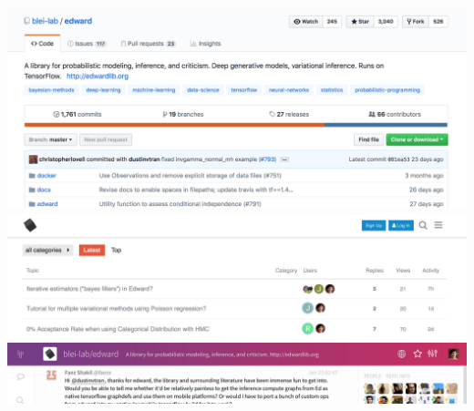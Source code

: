 \documentclass[10pt,
               xcolor={usenames,dvipsnames},
               hyperref={colorlinks,linktoc=all,citecolor=Plum,linkcolor=MidnightBlue,urlcolor=MidnightBlue},noamssymb]{beamer}
\begin{document}
\begin{frame}
\begin{center}
\vspace{-2.5ex}
\includegraphics[width=1.0\textwidth]{img/github.png}
\\[-1.5ex]
\includegraphics[width=1.0\textwidth]{img/forum.png}
\\[-3ex]
\includegraphics[width=1.0\textwidth]{img/gitter.png}
\\[2ex]
\end{center}
\end{frame}
\end{document}
